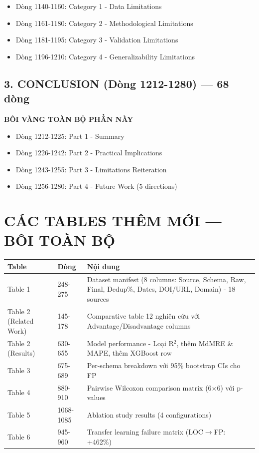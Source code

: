 \documentclass[11pt,a4paper]{article}
\begin{document}
\begin{itemize}
    \item Dòng 1140-1160: Category 1 - Data Limitations
    \item Dòng 1161-1180: Category 2 - Methodological Limitations
    \item Dòng 1181-1195: Category 3 - Validation Limitations
    \item Dòng 1196-1210: Category 4 - Generalizability Limitations
\end{itemize}

\subsection{3. CONCLUSION (Dòng 1212-1280) --- 68 dòng}
\textbf{BÔI VÀNG TOÀN BỘ PHẦN NÀY}

\begin{itemize}
    \item Dòng 1212-1225: Part 1 - Summary
    \item Dòng 1226-1242: Part 2 - Practical Implications
    \item Dòng 1243-1255: Part 3 - Limitations Reiteration
    \item Dòng 1256-1280: Part 4 - Future Work (5 directions)
\end{itemize}

\section{CÁC TABLES THÊM MỚI --- BÔI TOÀN BỘ}

\begin{center}
\begin{tabular}{|p{}|p{}|p{}|}
\hline
\textbf{Table} & \textbf{Dòng} & \textbf{Nội dung} \\
\hline
Table 1 & 248-275 & Dataset manifest (8 columns: Source, Schema, Raw, Final, Dedup\%, Dates, DOI/URL, Domain) - 18 sources \\
\hline
Table 2 (Related Work) & 145-178 & Comparative table 12 nghiên cứu với Advantage/Disadvantage columns \\
\hline
Table 2 (Results) & 630-655 & Model performance - Loại R$^2$, thêm MdMRE \& MAPE, thêm XGBoost row \\
\hline
Table 3 & 675-689 & Per-schema breakdown với 95\% bootstrap CIs cho FP \\
\hline
Table 4 & 880-910 & Pairwise Wilcoxon comparison matrix (6$\times$6) với p-values \\
\hline
Table 5 & 1068-1085 & Ablation study results (4 configurations) \\
\hline
Table 6 & 945-960 & Transfer learning failure matrix (LOC$\rightarrow$FP: +462\%) \\
\hline
\end{tabular}
\end{center}
\end{document}
